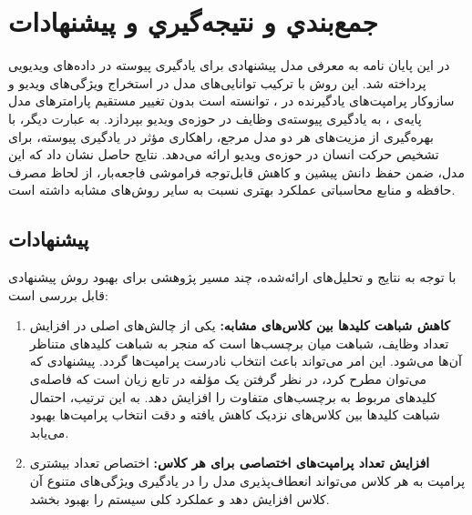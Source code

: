 \chapter{جمع‌بندي و نتيجه‌گيري و پیشنهادات}
\label{chap5:concolusion}
در این پایان نامه به معرفی مدل پیشنهادی  برای یادگیری پیوسته در داده‌های ویدیویی پرداخته شد. این روش با ترکیب توانایی‌های مدل  در استخراج ویژگی‌های ویدیو و سازوکار پرامپت‌های یادگیرنده در ، توانسته است بدون تغییر مستقیم پارامترهای مدل پایه‌ی ، به یادگیری پیوسته‌ی وظایف در حوزه‌ی ویدیو بپردازد. به عبارت دیگر،  با بهره‌گیری از مزیت‌های هر دو مدل مرجع، راهکاری مؤثر در یادگیری پیوسته، برای تشخیص حرکت انسان در حوزه‌ی ویدیو ارائه می‌دهد. نتایج حاصل نشان داد که این مدل، ضمن حفظ دانش پیشین و کاهش قابل‌توجه فراموشی فاجعه‌بار، از لحاظ مصرف حافظه و منابع محاسباتی عملکرد بهتری نسبت به سایر روش‌های مشابه داشته است. 
\section{پیشنهادات}
با توجه به نتایج و تحلیل‌های ارائه‌شده، چند مسیر پژوهشی برای بهبود روش پیشنهادی قابل بررسی است:

\begin{enumerate}
	\item \textbf{کاهش شباهت کلیدها بین کلاس‌های مشابه:} 
	یکی از چالش‌های اصلی در افزایش تعداد وظایف، شباهت میان برچسب‌ها است که منجر به شباهت کلیدهای متناظر آن‌ها می‌شود. این امر می‌تواند باعث انتخاب نادرست پرامپت‌ها گردد. پیشنهادی که می‌توان مطرح کرد، در نظر گرفتن یک مؤلفه در تابع زیان است که فاصله‌ی کلیدهای مربوط به برچسب‌های متفاوت را افزایش دهد. به این ترتیب، احتمال شباهت کلیدها بین کلاس‌های نزدیک کاهش یافته و دقت انتخاب پرامپت‌ها بهبود می‌یابد.
	
	\item \textbf{افزایش تعداد پرامپت‌های اختصاصی برای هر کلاس:} 
	اختصاص تعداد بیشتری پرامپت به هر کلاس می‌تواند انعطاف‌پذیری مدل را در یادگیری ویژگی‌های متنوع آن کلاس افزایش دهد و عملکرد کلی سیستم را بهبود بخشد.
\end{enumerate}